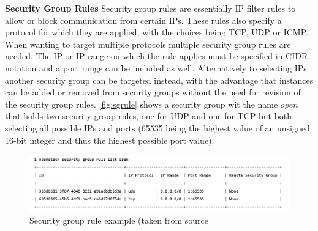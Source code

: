 \textbf{Security Group Rules}\label{sec:securitygrouprules} Security group rules are essentially IP filter rules to allow or block communication from certain IPs. These rules also specify a protocol for which they are applied, with the choices being TCP, UDP or ICMP. When wanting to target multiple protocols multiple security group rules are needed. The IP or IP range on which the rule applies must be specified in CIDR notation and a port range can be included as well. Alternatively to selecting IPs another security group can be targeted instead, with the advantage that instances can be added or removed from security groups without the need for revision of the security group rules. \autoref{fig:sgrule} shows a security group wit the name $open$ that holds two security group rules, one for UDP and one for TCP but both selecting all possible IPs and ports (65535 being the highest value of an unsigned 16-bit integer and thus the highest possible port value). \cite{sgrule}
\\[10pt]

\begin{figure}[htbp]
  \centering
  \includegraphics[width=\textwidth]{images/sgrule example.png} 
  \caption{Security group rule example (taken from source \cite{sg}}
  \label{fig:sgrule}
\end{figure}

\cleardoublepage
